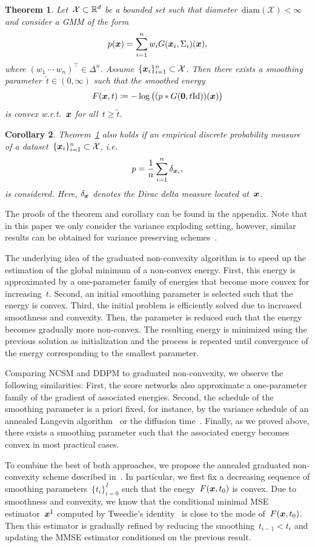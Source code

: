 \documentclass{article} %
\theoremstyle{plain}
\newtheorem{theorem}{Theorem}[section]
\newtheorem{corollary}[theorem]{Corollary}
\theoremstyle{definition}
\theoremstyle{remark}
\newcommand{\X}{\mathcal{X}}
\newcommand{\id}{\mathrm{Id}}
\renewcommand{\vec}[1]{\mathbf{#1}}
\newcommand{\diameter}{\mathrm{diam}}
\begin{document}
\begin{theorem}\label{thm:Fconvex}
Let~$\X\subset\R^d$ be a bounded set such that diameter~$\diameter(\X)<\infty$ and consider a GMM of the form
\[
p({\bm{x}}) = \sum_{i=1}^n w_i G({\bm{x}}_i,\Sigma_i)({\bm{x}}),
\]
where $(w_1\ \cdots \ w_n)^\top\in\Delta^n$. Assume~$\{\vx_i\}_{i=1}^n\subset\X$.
Then there exists a smoothing parameter~$\widetilde{t}\in(0,\infty)$ such that the smoothed energy
\[
F(\vx,t)\coloneqq -\log \big( (p \ast G(\vec{0}, t\id))(\vx)\big)
\]
is \emph{convex} w.r.t.~${\bm{x}}$ for all~$t\geq\widetilde{t}$.
\end{theorem}
\begin{corollary}
Theorem~\ref{thm:Fconvex} also holds if an empirical discrete probability measure of a dataset~$\{\vx_i\}_{i=1}^n\subset\X$, i.e.
\[
p = \frac{1}{n}\sum_{i=1}^n\delta_{{\bm{x}}_i},
\]
is considered.
Here, $\delta_{{\bm{x}}}$ denotes the Dirac delta measure located at~${\bm{x}}$.
\end{corollary}
The proofs of the theorem and corollary can be found in the appendix.
Note that in this paper we only consider the variance exploding setting, however, similar results can be obtained for variance preserving schemes~\citep{SoSo20}. 

The underlying idea of the graduated non-convexity algorithm is to speed up the estimation of the global minimum of a non-convex energy.
First, this energy is approximated by a one-parameter family of energies that become more convex for increasing~$t$.
Second, an initial smoothing parameter is selected such that the energy is convex.
Third, the initial problem is efficiently solved due to increased smoothness and convexity.
Then, the parameter is reduced such that the energy becomes gradually more non-convex.
The resulting energy is minimized using the previous solution as initialization and the process is repeated until convergence of the energy corresponding to the smallest parameter.

Comparing NCSM and DDPM to graduated non-convexity, we observe the following similarities:
First, the score networks also approximate a one-parameter family of the gradient of associated energies.
Second, the schedule of the smoothing parameter is a priori fixed, for instance, by the variance schedule of an annealed Langevin algorithm~\citep{SoEr19} or the diffusion time~\citep{HoJa20}.
Finally, as we proved above, there exists a smoothing parameter such that the associated energy becomes convex in most practical cases.

To combine the best of both approaches, we propose the annealed graduated non-convexity scheme described in~.
In particular, we first fix a decreasing sequence of smoothing parameters~$\{t_i\}_{i=0}^I$ such that the enegy~$F({\bm{x}},t_0)$ is convex.
Due to smoothness and convexity, we know that the conditional minimal MSE estimator~${\bm{x}}^1$ computed by Tweedie's identity~\citep{Ro56,Ef11} is close to the mode of~$F({\bm{x}},t_0)$.
Then this estimator is gradually refined by reducing the smoothing~$t_{i-1}<t_i$ and updating the MMSE estimator conditioned on the previous result.
\end{document}
